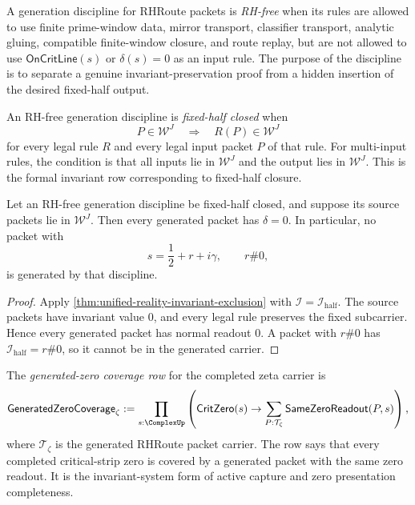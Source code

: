\begin{definition}
\label{def:unified-reality-rh-free-generation-discipline}
A generation discipline for RHRoute packets is \emph{RH-free} when its
rules are allowed to use finite prime-window data, mirror transport,
classifier transport, analytic gluing, compatible finite-window closure,
and route replay, but are not allowed to use $\mathsf{OnCritLine}(s)$ or
$\delta(s)=0$ as an input rule.  The purpose of the discipline is to
separate a genuine invariant-preservation proof from a hidden insertion
of the desired fixed-half output.
\end{definition}

\begin{definition}
\label{def:unified-reality-fixed-half-closed-generation}
An RH-free generation discipline is \emph{fixed-half closed} when
$$
P\in\mathcal W^J
\quad\Longrightarrow\quad
R(P)\in\mathcal W^J
$$
for every legal rule $R$ and every legal input packet $P$ of that rule.
For multi-input rules, the condition is that all inputs lie in
$\mathcal W^J$ and the output lies in $\mathcal W^J$.  This is the
formal invariant row corresponding to fixed-half closure.
\end{definition}

\begin{theorem}
\label{thm:unified-reality-fixed-half-generation-excludes-off-half}
Let an RH-free generation discipline be fixed-half closed, and suppose
its source packets lie in $\mathcal W^J$.  Then every generated packet
has $\delta=0$.  In particular, no packet with
$$
s=\frac12+r+i\gamma,
\qquad
r\#0,
$$
is generated by that discipline.
\end{theorem}

\begin{proof}
Apply \autoref{thm:unified-reality-invariant-exclusion} with
$\mathcal I=\mathcal I_{\mathrm{half}}$.  The source packets have
invariant value $0$, and every legal rule preserves the fixed subcarrier.
Hence every generated packet has normal readout $0$.  A packet with
$r\#0$ has $\mathcal I_{\mathrm{half}}=r\#0$, so it cannot be in the
generated carrier.
\end{proof}

\begin{definition}
\label{def:unified-reality-generated-zero-coverage-row}
The \emph{generated-zero coverage row} for the completed zeta carrier is
$$
\mathsf{GeneratedZeroCoverage}_{\zeta}
:=
\prod_{s:\ComplexUp}
\left(
\mathsf{CritZero}(s)
\to
\sum_{P:\mathcal T_{\zeta}}
\mathsf{SameZeroReadout}(P,s)
\right),
$$
where $\mathcal T_{\zeta}$ is the generated RHRoute packet carrier.  The
row says that every completed critical-strip zero is covered by a
generated packet with the same zero readout.  It is the invariant-system
form of active capture and zero presentation completeness.
\end{definition}

